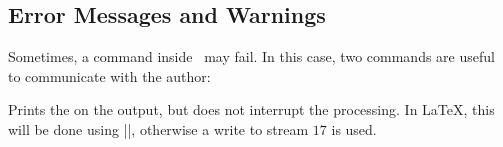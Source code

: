 \subsection{Error Messages and Warnings}

Sometimes, a command inside \pgfname\ may fail. In this case, two commands are
useful to communicate with the author:


\begin{command}{\pgfwarning{}}
    Prints the  on the output, but does not interrupt the
    processing. In \LaTeX, this will be done using |\PackageWarning|, otherwise
    a write to stream $17$ is used.
\end{command}
